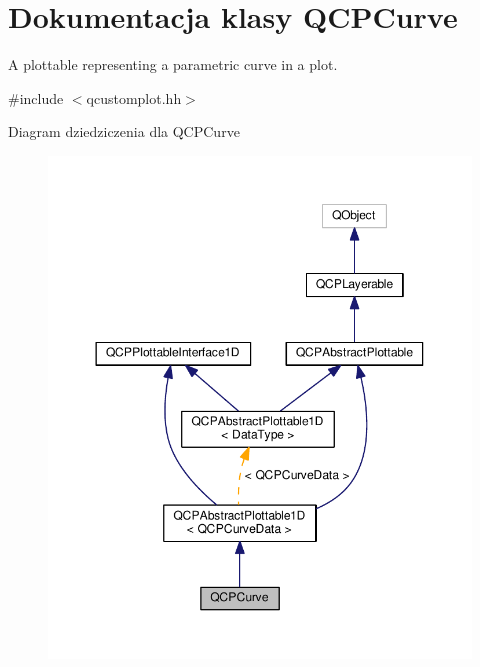 \hypertarget{class_q_c_p_curve}{}\section{Dokumentacja klasy Q\+C\+P\+Curve}
\label{class_q_c_p_curve}


A plottable representing a parametric curve in a plot.  




{\ttfamily \#include $<$qcustomplot.\+hh$>$}



Diagram dziedziczenia dla Q\+C\+P\+Curve\nopagebreak
\begin{figure}[H]
\begin{center}
\leavevmode
\includegraphics[width=350pt]{class_q_c_p_curve__inherit__graph}
\end{center}
\end{figure}


